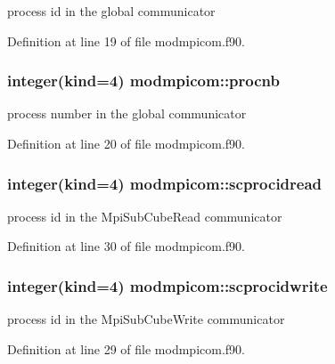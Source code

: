 process id in the global communicator 



Definition at line 19 of file modmpicom.\+f90.

\subsubsection[{\texorpdfstring{procnb}{procnb}}]{\setlength{\rightskip}{0pt plus 5cm}integer(kind=4) modmpicom\+::procnb}\hypertarget{namespacemodmpicom_a5e40853b0f15e4c14658ea56fb1b9b73}{}\label{namespacemodmpicom_a5e40853b0f15e4c14658ea56fb1b9b73}


process number in the global communicator 



Definition at line 20 of file modmpicom.\+f90.

\subsubsection[{\texorpdfstring{scprocidread}{scprocidread}}]{\setlength{\rightskip}{0pt plus 5cm}integer(kind=4) modmpicom\+::scprocidread}\hypertarget{namespacemodmpicom_a23d8fed28f6705c564d6a10038de36c7}{}\label{namespacemodmpicom_a23d8fed28f6705c564d6a10038de36c7}


process id in the Mpi\+Sub\+Cube\+Read communicator 



Definition at line 30 of file modmpicom.\+f90.

\subsubsection[{\texorpdfstring{scprocidwrite}{scprocidwrite}}]{\setlength{\rightskip}{0pt plus 5cm}integer(kind=4) modmpicom\+::scprocidwrite}\hypertarget{namespacemodmpicom_a0bade7a409f7af1432be0253a6262442}{}\label{namespacemodmpicom_a0bade7a409f7af1432be0253a6262442}


process id in the Mpi\+Sub\+Cube\+Write communicator 



Definition at line 29 of file modmpicom.\+f90.


